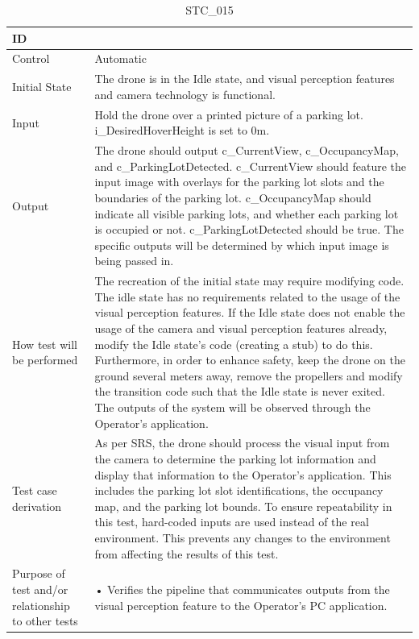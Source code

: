 \documentclass[12pt, titlepage]{article}
\begin{document}
\begin{table}[!h]
\begin{center}
\caption {STC\_015}
\label{tab:STC_015}
\begin{tabular}{ | m{1.5cm} | m{15cm} | } 
\hline
ID & \nameref{tab:STC_015} \\ 
\hline
Control & Automatic \\ 
\hline
Initial State & The drone is in the Idle state, and visual perception features and camera technology is functional.
\\ 
\hline
Input & Hold the drone over a printed picture of a parking lot. i\_DesiredHoverHeight is set to 0m. \\ 
\hline
Output & The drone should output c\_CurrentView, c\_OccupancyMap, and c\_ParkingLotDetected. c\_CurrentView should feature the input image with overlays for the parking lot slots and the boundaries of the parking lot. c\_OccupancyMap should indicate all visible parking lots, and whether each parking lot is occupied or not. c\_ParkingLotDetected should be true. The specific outputs will be determined by which input image is being passed in. \\ 
\hline
How test will be performed & The recreation of the initial state may require modifying code. The idle state has no requirements related to the usage of the visual perception features. If the Idle state does not enable the usage of the camera and visual perception features already, modify the Idle state's code (creating a stub) to do this. Furthermore, in order to enhance safety, keep the drone on the ground several meters away, remove the propellers and modify the transition code such that the Idle state is never exited.  The outputs of the system will be observed through the Operator's application.  \\ 
\hline
Test case derivation & As per SRS, the drone should process the visual input from the camera to determine the parking lot information and display that information to the Operator's application. This includes the parking lot slot identifications, the occupancy map, and the parking lot bounds. To ensure repeatability in this test, hard-coded inputs are used instead of the real environment. This prevents any changes to the environment from affecting the results of this test.  \\ 
\hline
Purpose of test and/or relationship to other tests &  • Verifies the pipeline that communicates outputs from the visual perception feature to the Operator's PC application.


\end{tabular}
\end{center}
\end{table}
\end{document}
